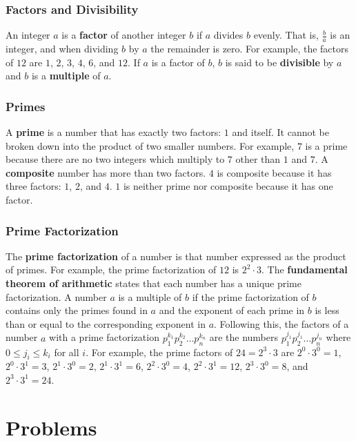 \documentclass[twocolumn]{article}
\begin{document}
\subsubsection*{Factors and Divisibility}
An integer $a$ is a \textbf{factor} of another integer $b$ if $a$ divides $b$ 
evenly. That is, $\frac{b}{a}$ is an integer, and when dividing $b$ by $a$ the 
remainder is zero. For example, the factors of $12$ are $1$, $2$, $3$, $4$, $6$, 
and $12$. If $a$ is a factor of $b$, $b$ is said to be \textbf{divisible} by $a$ 
and $b$ is a \textbf{multiple} of $a$.

\subsubsection*{Primes}
A \textbf{prime} is a number that has exactly two factors: $1$ and itself. It 
cannot be broken down into the product of two smaller numbers. For example, $7$ 
is a prime because there are no two integers which multiply to $7$ other than 
$1$ and $7$. A \textbf{composite} number has more than two factors. $4$ is 
composite because it has three factors: $1$, $2$, and $4$. $1$ is neither prime 
nor composite because it has one factor.

\subsubsection*{Prime Factorization}
The \textbf{prime factorization} of a number is that number expressed as the 
product of primes. For example, the prime factorization of $12$ is $2^2 \cdot 
3$. The \textbf{fundamental theorem of arithmetic} states that each number has a 
unique prime factorization. A number $a$ is a multiple of $b$ if the prime 
factorization of $b$ contains only the primes found in $a$ and the exponent of 
each prime in $b$ is less than or equal to the corresponding exponent in $a$. 
Following this, the factors of a number $a$ with a prime factorization 
$p_1^{k_1} p_2^{k_2} \dots p_n^{k_n}$ are the numbers $p_1^{j_1} p_2^{j_1} \dots 
p_n^{j_n}$ where $0 \leq j_i \leq k_i$ for all $i$. For example, the prime 
factors of $24 = 2^3 \cdot 3$ are $2^0 \cdot 3^0 = 1$, $2^0 \cdot 3^1 = 3$, $2^1 
\cdot 3^0 = 2$, $2^1 \cdot 3^1 = 6$, $2^2 \cdot 3^0 = 4$, $2^2 \cdot 3^1 = 12$, 
$2^3 \cdot 3^0 = 8$, and $2^3 \cdot 3^1 = 24$.
\section*{Problems}
\end{document}
